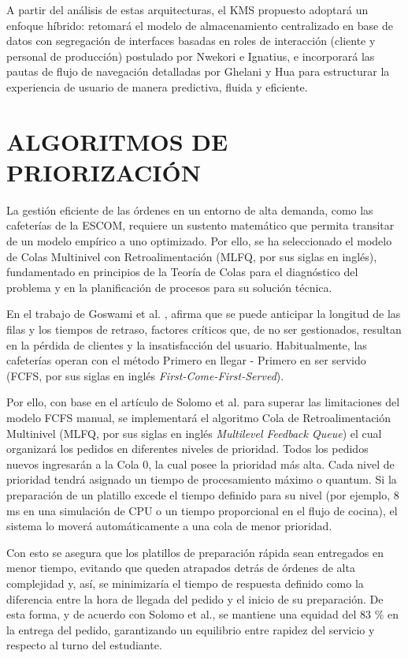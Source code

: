 A partir del análisis de estas arquitecturas, el KMS propuesto adoptará un enfoque híbrido: retomará el modelo de almacenamiento centralizado en base de datos con segregación de interfaces basadas en roles de interacción (cliente y personal de producción) postulado por Nwekori e Ignatius, e incorporará las pautas de flujo de navegación detalladas por Ghelani y Hua para estructurar la experiencia de usuario de manera predictiva, fluida y eficiente. 

\section{ALGORITMOS DE PRIORIZACIÓN}
La gestión eficiente de las órdenes en un entorno de alta demanda, como las cafeterías de la ESCOM, requiere un sustento matemático que permita transitar de un modelo empírico a uno optimizado. Por ello, se ha seleccionado el modelo de Colas Multinivel con Retroalimentación (MLFQ, por sus siglas en inglés), fundamentado en principios de la Teoría de Colas para el diagnóstico del problema y en la planificación de procesos para su solución técnica. 

En el trabajo de Goswami et al. \cite{goswami2023use}, afirma que se puede anticipar la longitud de las filas y los tiempos de retraso, factores críticos que, de no ser gestionados, resultan en la pérdida de clientes y la insatisfacción del usuario. Habitualmente, las cafeterías operan con el método Primero en llegar - Primero en ser servido (FCFS, por sus siglas en inglés \textit{First-Come-First-Served}).

Por ello, con base en el artículo de Solomo et al. \cite{salomo2019multilevel} para superar las limitaciones del modelo FCFS manual, se implementará el algoritmo Cola de Retroalimentación Multinivel (MLFQ, por sus siglas en inglés \textit{Multilevel Feedback Queue}) el cual organizará los pedidos en diferentes niveles de prioridad. Todos los pedidos nuevos ingresarán a la Cola 0, la cual posee la prioridad más alta. Cada nivel de prioridad tendrá asignado un tiempo de procesamiento máximo o quantum. Si la preparación de un platillo excede el tiempo definido para su nivel (por ejemplo, 8 ms en una simulación de CPU o un tiempo proporcional en el flujo de cocina), el sistema lo moverá automáticamente a una cola de menor prioridad.

Con esto se asegura que los platillos de preparación rápida sean entregados en menor tiempo, evitando que queden atrapados detrás de órdenes de alta complejidad y, así, se minimizaría el tiempo de respuesta definido como la diferencia entre la hora de llegada del pedido y el inicio de su preparación. De esta forma, y de acuerdo con Solomo et al., se mantiene una equidad del 83 \% en la entrega del pedido, garantizando un equilibrio entre rapidez del servicio y respecto al turno del estudiante. 